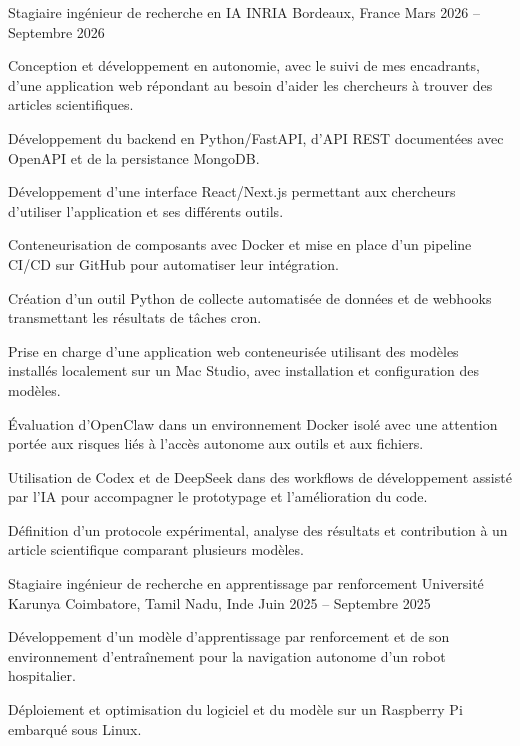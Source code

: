 
\begin{cventries}
  \cventry
    {Stagiaire ingénieur de recherche en IA}
    {INRIA}
    {Bordeaux, France}
    {Mars 2026 -- Septembre 2026}
    {
      \begin{cvitems}
        \item {Conception et développement en autonomie, avec le suivi de mes encadrants, d’une application web répondant au besoin d’aider les chercheurs à trouver des articles scientifiques.}
        \item {Développement du backend en Python/FastAPI, d’API REST documentées avec OpenAPI et de la persistance MongoDB.}
        \item {Développement d’une interface React/Next.js permettant aux chercheurs d’utiliser l’application et ses différents outils.}
        \item {Conteneurisation de composants avec Docker et mise en place d’un pipeline CI/CD sur GitHub pour automatiser leur intégration.}
        \item {Création d’un outil Python de collecte automatisée de données et de webhooks transmettant les résultats de tâches cron.}
        \item {Prise en charge d’une application web conteneurisée utilisant des modèles installés localement sur un Mac Studio, avec installation et configuration des modèles.}
        \item {Évaluation d’OpenClaw dans un environnement Docker isolé avec une attention portée aux risques liés à l’accès autonome aux outils et aux fichiers.}
        \item {Utilisation de Codex et de DeepSeek dans des workflows de développement assisté par l’IA pour accompagner le prototypage et l’amélioration du code.}
        \item {Définition d’un protocole expérimental, analyse des résultats et contribution à un article scientifique comparant plusieurs modèles.}
      \end{cvitems}
    }

  \cventry
    {Stagiaire ingénieur de recherche en apprentissage par renforcement}
    {Université Karunya}
    {Coimbatore, Tamil Nadu, Inde}
    {Juin 2025 -- Septembre 2025}
    {
      \begin{cvitems}
        \item {Développement d’un modèle d’apprentissage par renforcement et de son environnement d’entraînement pour la navigation autonome d’un robot hospitalier.}
        \item {Déploiement et optimisation du logiciel et du modèle sur un Raspberry Pi embarqué sous Linux.}
      \end{cvitems}
    }
\end{cventries}
